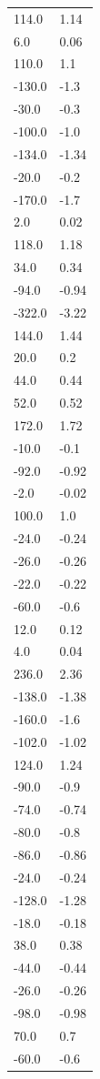 \begin{longtable}{ll}
114.0 & 1.14 \\
6.0 & 0.06 \\
110.0 & 1.1 \\
-130.0 & -1.3 \\
-30.0 & -0.3 \\
-100.0 & -1.0 \\
-134.0 & -1.34 \\
-20.0 & -0.2 \\
-170.0 & -1.7 \\
2.0 & 0.02 \\
118.0 & 1.18 \\
34.0 & 0.34 \\
-94.0 & -0.94 \\
-322.0 & -3.22 \\
144.0 & 1.44 \\
20.0 & 0.2 \\
44.0 & 0.44 \\
52.0 & 0.52 \\
172.0 & 1.72 \\
-10.0 & -0.1 \\
-92.0 & -0.92 \\
-2.0 & -0.02 \\
100.0 & 1.0 \\
-24.0 & -0.24 \\
-26.0 & -0.26 \\
-22.0 & -0.22 \\
-60.0 & -0.6 \\
12.0 & 0.12 \\
4.0 & 0.04 \\
236.0 & 2.36 \\
-138.0 & -1.38 \\
-160.0 & -1.6 \\
-102.0 & -1.02 \\
124.0 & 1.24 \\
-90.0 & -0.9 \\
-74.0 & -0.74 \\
-80.0 & -0.8 \\
-86.0 & -0.86 \\
-24.0 & -0.24 \\
-128.0 & -1.28 \\
-18.0 & -0.18 \\
38.0 & 0.38 \\
-44.0 & -0.44 \\
-26.0 & -0.26 \\
-98.0 & -0.98 \\
70.0 & 0.7 \\
-60.0 & -0.6 \\

\end{longtable}
